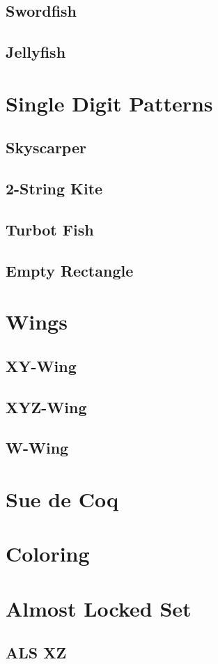 \documentclass[accentcolor=tud6b,11pt,paper=a4]{tudreport}
\begin{document}
\subsection{Swordfish}
\subsection{Jellyfish}
\section{Single Digit Patterns}
\subsection{Skyscarper}
\subsection{2-String Kite}
\subsection{Turbot Fish}
\subsection{Empty Rectangle}
\section{Wings}
\subsection{XY-Wing}
\subsection{XYZ-Wing}
\subsection{W-Wing}
\section{Sue de Coq}
\section{Coloring}
\section{Almost Locked Set}
\subsection{ALS XZ}
\end{document}
